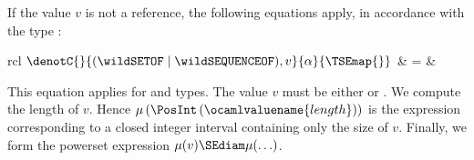 \medskip

\noindent
If the value $v$ is not a reference, the following equations apply,
in accordance with the type \T:

\medskip

\noindent
\begin{tabular}{rcl}
    $\denotC{}{(\wildSETOF \mid \wildSEQUENCEOF),
     v}{\alpha}{\TSEmap{}}$
  & \hspace*{-4mm} = &\\
\end{tabular}

\medskip

\noindent
This equation applies for \kwdSETOF{} and \kwdSEQUENCEOF{} types. The
value $v$ must be either \List{} or \Nil. We compute the length
 of $v$. Hence $\mu \, (\PosInt \,
(\ocamlvaluename{length}))$ is the expression corresponding to a
closed integer interval containing only the size of $v$. Finally, we
form the powerset expression $\mu (v) \SEdiam \mu (\ldots)$.

